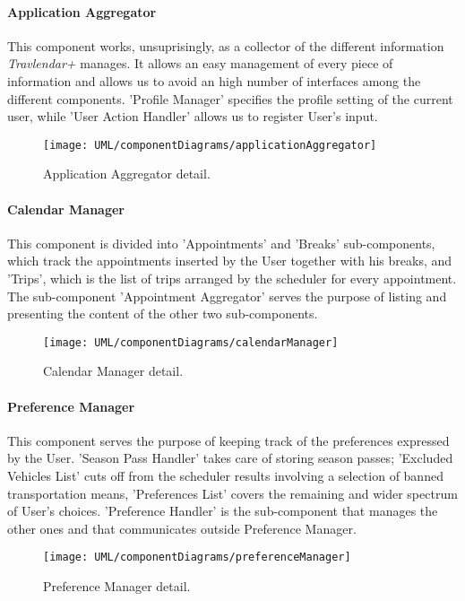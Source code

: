 		
	\paragraph{Application Aggregator}
		This component works, unsuprisingly, as a collector of the different information \textit{Travlendar+} manages. It allows an easy management of every piece of information and allows us to avoid an high number of interfaces among the different components. 'Profile Manager' specifies the profile setting of the current user, while 'User Action Handler' allows us to register User's input.
	
		\begin{figure}[H]
			\centering
			\texttt{[image: UML/componentDiagrams/applicationAggregator]}
			\caption{Application Aggregator detail.}
			\label{applicationAggregatorDetail}
		\end{figure}
 
 
	\paragraph{Calendar Manager}
		This component is divided into 'Appointments' and 'Breaks' sub-components, which track the appointments inserted by the User together with his breaks, and 'Trips', which is the list of trips arranged by the scheduler for every appointment. The sub-component 'Appointment Aggregator' serves the purpose of listing and presenting the content of the other two sub-components.
	
		\begin{figure}[H]
			\centering
			\texttt{[image: UML/componentDiagrams/calendarManager]}
			\caption{Calendar Manager detail.}
			\label{calendarManagerDetail}
		\end{figure}
 

	\paragraph{Preference Manager}
		This component serves the purpose of keeping track of the preferences expressed by the User. 'Season Pass Handler' takes care of storing season passes; 'Excluded Vehicles List' cuts off from the scheduler results involving a selection of banned transportation means, 'Preferences List' covers the remaining and wider spectrum of User's choices. 'Preference Handler' is the sub-component that manages the other ones and that communicates outside Preference Manager.

		\begin{figure}[H]
			\centering
			\texttt{[image: UML/componentDiagrams/preferenceManager]}
			\caption{Preference Manager detail.}
			\label{preferenceManagerDetail}
		\end{figure}


